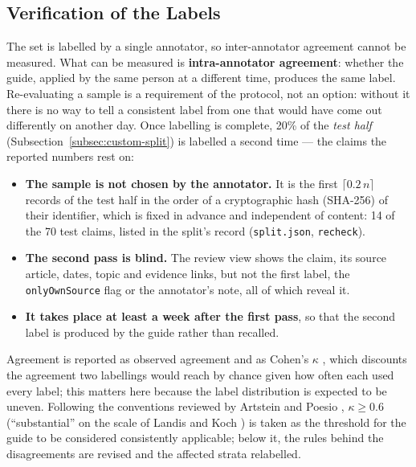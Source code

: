
\subsection{Verification of the Labels}
\label{subsec:custom-review}

The set is labelled by a single annotator, so inter-annotator
agreement cannot be measured. What can be measured is
\textbf{intra-annotator agreement}: whether the guide, applied by the
same person at a different time, produces the same label. Re-evaluating
a sample is a requirement of the protocol, not an option: without it
there is no way to tell a consistent label from one that would have come
out differently on another day. Once labelling is complete, 20\% of the
\emph{test half} (Subsection~\ref{subsec:custom-split}) is labelled a
second time --- the claims the reported numbers rest on:

\begin{itemize}
    \item \textbf{The sample is not chosen by the annotator.} It is
    the first $\lceil 0.2\,n \rceil$ records of the test half in the
    order of a cryptographic hash (SHA-256) of their identifier, which
    is fixed in advance and independent of content: 14 of the 70
    test claims, listed in the split's record
    (\texttt{split.json}, \texttt{recheck}).
    \item \textbf{The second pass is blind.} The review view shows
    the claim, its source article, dates, topic and evidence links,
    but not the first label, the \texttt{onlyOwnSource} flag or the
    annotator's note, all of which reveal it.
    \item \textbf{It takes place at least a week after the first
    pass}, so that the second label is produced by the guide rather
    than recalled.
\end{itemize}

Agreement is reported as observed agreement and as Cohen's $\kappa$
\cite{cohen1960coefficient}, which discounts the agreement two
labellings would reach by chance given how often each used every
label; this matters here because the label distribution is expected
to be uneven. Following the conventions reviewed by Artstein and
Poesio \cite{artstein2008intercoder}, $\kappa \geq 0.6$ (``substantial''
on the scale of Landis and Koch \cite{landis1977measurement}) is taken
as the threshold for the guide to be considered consistently
applicable; below it, the rules behind the disagreements are revised
and the affected strata relabelled.

